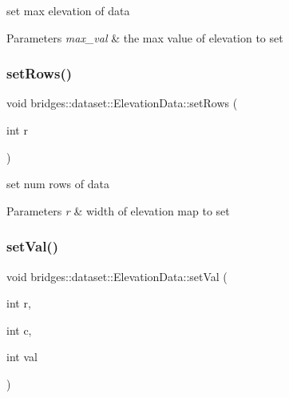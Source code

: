 set max elevation of data 
\begin{DoxyParams}{Parameters}
{\em max\+\_\+val} & the max value of elevation to set \\
\hline
\end{DoxyParams}
\mbox{\label{classbridges_1_1dataset_1_1_elevation_data_a07c1929c481e06e6f1e01495aa319c57}} 
\subsubsection{\texorpdfstring{set\+Rows()}{setRows()}}
{\footnotesize\ttfamily void bridges\+::dataset\+::\+Elevation\+Data\+::set\+Rows (\begin{DoxyParamCaption}\item[{int}]{r }\end{DoxyParamCaption})\hspace{0.3cm}{\ttfamily [inline]}}

set num rows of data


\begin{DoxyParams}{Parameters}
{\em r} & width of elevation map to set \\
\hline
\end{DoxyParams}
\mbox{\label{classbridges_1_1dataset_1_1_elevation_data_aa917c02a316f30d8e92d38bfb26fff9a}} 
\subsubsection{\texorpdfstring{set\+Val()}{setVal()}}
{\footnotesize\ttfamily void bridges\+::dataset\+::\+Elevation\+Data\+::set\+Val (\begin{DoxyParamCaption}\item[{int}]{r,  }\item[{int}]{c,  }\item[{int}]{val }\end{DoxyParamCaption})\hspace{0.3cm}{\ttfamily [inline]}}

